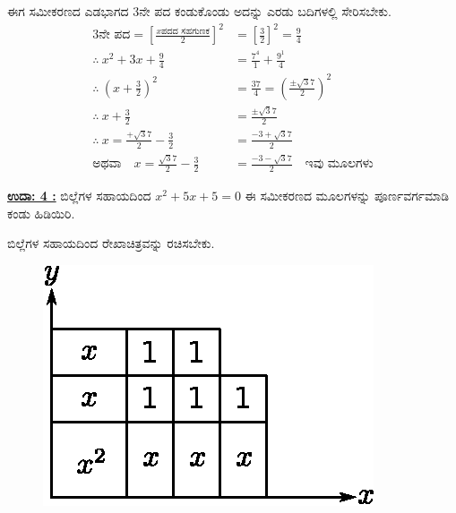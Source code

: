 ಈಗ ಸಮೀಕರಣದ ಎಡಭಾಗದ 3ನೇ ಪದ ಕಂಡುಕೊಂಡು ಅದನ್ನು ಎರಡು ಬದಿಗಳಲ್ಲಿ ಸೇರಿಸಬೇಕು. 
\begin{align*}
3\text{ನೇ ಪದ} = \left[\frac{x\text{ಪದದ ಸಹಗುಣಕ}}{2} \right]^2 & = \left[\frac{3}{2} \right]^2 = \frac{9}{4}\\
\therefore~ x^2 + 3x + \frac{9}{4} & = \frac{7^4}{1} + \frac{9^1}{4}\\
\therefore~ \left(x + \frac{3}{2} \right)^2 & = \frac{37}{4} = \left(\frac{\pm \surd37}{2} \right)^2\\
\therefore~ x + \frac{3}{2} & = \frac{\pm \surd37}{2}\\
\therefore~ x = \frac{+ \surd 37}{2} - \frac{3}{2} & = \frac{-3 + \surd37}{2}\\
\text{ಅಥವಾ}\quad x = \frac{\surd37}{2} - \frac{3}{2} & = \frac{-3 -\surd37}{2} \quad\text{ಇವು ಮೂಲಗಳು}
\end{align*}

\noindent
{\textbf{\underline{ಉದಾ: 4 :}}} ಬಿಲ್ಲೆಗಳ ಸಹಾಯದಿಂದ $x^2 + 5x + 5 = 0$ ಈ ಸಮೀಕರಣದ ಮೂಲಗಳನ್ನು ಪೂರ್ಣವರ್ಗಮಾಡಿ ಕಂಡು ಹಿಡಿಯಿರಿ. 

ಬಿಲ್ಲೆಗಳ ಸಹಾಯದಿಂದ ರೇಖಾಚಿತ್ರವನ್ನು ರಚಿಸಬೇಕು.

\newpage

\begin{figure}[H]
\centering
\includegraphics[scale=0.8]{src/figure/chap3/fig3-50.eps}
\end{figure}


